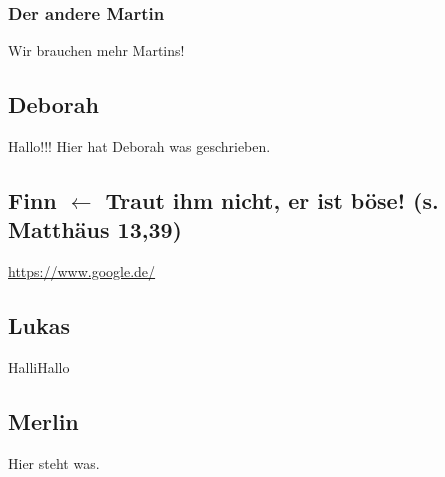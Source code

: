 \documentclass[12pt]{scrartcl}
\begin{document}
\subsubsection{Der andere Martin}
Wir brauchen mehr Martins!

\subsection{Deborah}
Hallo!!! Hier hat Deborah was geschrieben.
\subsection{Finn $\leftarrow$ Traut ihm nicht, er ist böse! (s. Matthäus 13,39)}
\url{https://www.google.de/}

\subsection{Lukas}
HalliHallo


\subsection{Merlin}
Hier steht was.
\end{document}
